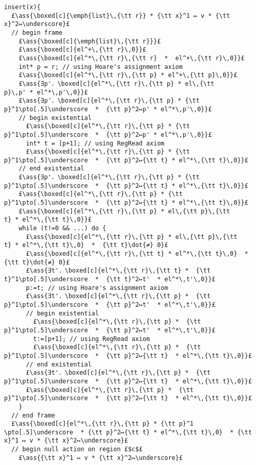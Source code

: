 \documentclass[12pt,a4paper]{article}
\makeatletter
\newcommand{\ml}[2][t]{\mbox{\mdseries\begin{tabular}[#1]{@{}L@{}}#2\end{tabular}}}
\newcommand{\ass}[1]{\ensuremath{{\color{blue}\left\{\ml[c]{#1}\right\}}}}
\makeatother
\begin{document}
\begin{lstlisting}
insert(x){
  £\ass{\boxed[c]{\emph{list}\,{\tt r}} * {\tt x}^1 ↦ v * {\tt x}^2↦\underscore}£
  // begin frame
    £\ass{\boxed[c]{\emph{list}\,{\tt r}}}£
    £\ass{\boxed[c]{el^+\,{\tt r}\,0}}£
    £\ass{\boxed[c]{el^*\,{\tt r}\,{\tt r}  *  el^+\,{\tt r}\,0}}£
    int* p = r; // using Hoare's assignment axiom
    £\ass{\boxed[c]{el^*\,{\tt r}\,{\tt p} * el^+\,{\tt p}\,0}}£
    £\ass{∃p'．\boxed[c]{el^*\,{\tt r}\,{\tt p} * el\,{\tt p}\,p' * el^*\,p'\,0}}£
    £\ass{∃p'．\boxed[c]{el^*\,{\tt r}\,{\tt p} * {\tt p}^1\pto[.5]\underscore  *  {\tt p}^2↦p' * el^*\,p'\,0}}£
    // begin existential
      £\ass{\boxed[c]{el^*\,{\tt r}\,{\tt p} * {\tt p}^1\pto[.5]\underscore  *  {\tt p}^2↦p' * el^*\,p'\,0}}£
      int* t = [p+1]; // using RegRead axiom
      £\ass{\boxed[c]{el^*\,{\tt r}\,{\tt p} * {\tt p}^1\pto[.5]\underscore  *  {\tt p}^2↦{\tt t} * el^*\,{\tt t}\,0}}£
    // end existential
    £\ass{∃p'．\boxed[c]{el^*\,{\tt r}\,{\tt p} * {\tt p}^1\pto[.5]\underscore  *  {\tt p}^2↦{\tt t} * el^*\,{\tt t}\,0}}£
    £\ass{\boxed[c]{el^*\,{\tt r}\,{\tt p} * {\tt p}^1\pto[.5]\underscore  *  {\tt p}^2↦{\tt t} * el^*\,{\tt t}\,0}}£
    £\ass{\boxed[c]{el^*\,{\tt r}\,{\tt p} * el\,{\tt p}\,{\tt t} * el^*\,{\tt t}\,0}}£
    while (t!=0 && ...) do {
      £\ass{\boxed[c]{el^*\,{\tt r}\,{\tt p} * el\,{\tt p}\,{\tt t} * el^*\,{\tt t}\,0}  *  {\tt t}\dot{≠} 0}£
      £\ass{\boxed[c]{el^*\,{\tt r}\,{\tt t} * el^*\,{\tt t}\,0}  *  {\tt t}\dot{≠} 0}£
      £\ass{∃t'．\boxed[c]{el^*\,{\tt r}\,{\tt t} *  {\tt t}^1\pto[.5]\underscore  *  {\tt t}^2↦t'  * el^*\,t'\,0}}£
      p:=t; // using Hoare's assignment axiom
      £\ass{∃t'．\boxed[c]{el^*\,{\tt r}\,{\tt p} *  {\tt p}^1\pto[.5]\underscore  *  {\tt p}^2↦t'  * el^*\,t'\,0}}£
      // begin existential
        £\ass{\boxed[c]{el^*\,{\tt r}\,{\tt p} *  {\tt p}^1\pto[.5]\underscore  *  {\tt p}^2↦t'  * el^*\,t'\,0}}£
        t:=[p+1]; // using RegRead axiom
        £\ass{\boxed[c]{el^*\,{\tt r}\,{\tt p} *  {\tt p}^1\pto[.5]\underscore  *  {\tt p}^2↦{\tt t}  * el^*\,{\tt t}\,0}}£
      // end existential
      £\ass{∃t'．\boxed[c]{el^*\,{\tt r}\,{\tt p} *  {\tt p}^1\pto[.5]\underscore  *  {\tt p}^2↦{\tt t}  * el^*\,{\tt t}\,0}}£
      £\ass{\boxed[c]{el^*\,{\tt r}\,{\tt p} *  {\tt p}^1\pto[.5]\underscore  *  {\tt p}^2↦{\tt t}  * el^*\,{\tt t}\,0}}£
    }
  // end frame
  £\ass{\boxed[c]{el^*\,{\tt r}\,{\tt p} * {\tt p}^1 \pto[.5]\underscore  * {\tt p}^2↦{\tt t} * el^*\,{\tt t}\,0}  * {\tt x}^1 ↦ v * {\tt x}^2↦\underscore}£
  // begin null action on region £$c$£
    £\ass{{\tt x}^1 ↦ v * {\tt x}^2↦\underscore}£

\end{lstlisting}
\end{document}
